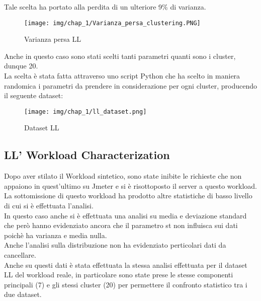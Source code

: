 Tale scelta ha portato alla perdita di un ulteriore 9\% di varianza.\\
\begin{figure}[H]
    \centering
    \texttt{[image: img/chap\_1/Varianza\_persa\_clustering.PNG]}
    \caption{Varianza persa LL}
    \label{fig:variance_loss}
\end{figure}
\noindent
Anche in questo caso sono stati scelti tanti parametri quanti sono i cluster, dunque 20.\\
La scelta è stata fatta attraverso uno script Python che ha scelto in maniera randomica i parametri da prendere in considerazione per ogni cluster, producendo il seguente dataset:
\begin{figure}[H]
    \centering
    \texttt{[image: img/chap\_1/ll\_dataset.png]}
    \caption{Dataset LL}
    \label{fig:data_selected_LL}
\end{figure}
\noindent
\subsection{LL' Workload Characterization}
Dopo aver stilato il Workload sintetico, sono state inibite le richieste che non appaiono in quest'ultimo su Jmeter e si è risottoposto il server a questo workload.\\
La sottomissione di questo workload ha prodotto altre statistiche di basso livello di cui si è effettuata l'analisi.\\
In questo caso anche si è effettuata una analisi su media e deviazione standard che però hanno evidenziato ancora che il parametro st non influisca sui dati poichè ha varianza e media nulla.\\
Anche l'analisi sulla distribuzione non ha evidenziato perticolari dati da cancellare.\\
Anche su questi dati è stata effettuata la stessa analisi effettuata per il dataset LL del workload reale, in particolare sono state prese le stesse componenti principali (7) e gli stessi cluster (20) per permettere il confronto statistico tra i due dataset.\\
